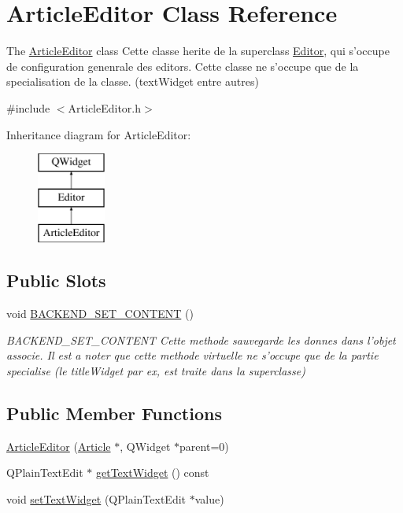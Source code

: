 \hypertarget{class_article_editor}{\section{Article\-Editor Class Reference}
\label{class_article_editor}
}


The \hyperlink{class_article_editor}{Article\-Editor} class Cette classe herite de la superclass \hyperlink{class_editor}{Editor}, qui s'occupe de configuration genenrale des editors. Cette classe ne s'occupe que de la specialisation de la classe. (text\-Widget entre autres)  




{\ttfamily \#include $<$Article\-Editor.\-h$>$}

Inheritance diagram for Article\-Editor\-:\begin{figure}[H]
\begin{center}
\leavevmode
\includegraphics[height=3.000000cm]{class_article_editor}
\end{center}
\end{figure}
\subsection*{Public Slots}
\begin{DoxyCompactItemize}
\item 
void \hyperlink{class_article_editor_a48c7f83de47d2710689c74069311c760}{B\-A\-C\-K\-E\-N\-D\-\_\-\-S\-E\-T\-\_\-\-C\-O\-N\-T\-E\-N\-T} ()
\begin{DoxyCompactList}\small\item\em B\-A\-C\-K\-E\-N\-D\-\_\-\-S\-E\-T\-\_\-\-C\-O\-N\-T\-E\-N\-T Cette methode sauvegarde les donnes dans l'objet associe. Il est a noter que cette methode virtuelle ne s'occupe que de la partie specialise (le title\-Widget par ex, est traite dans la superclasse) \end{DoxyCompactList}\end{DoxyCompactItemize}
\subsection*{Public Member Functions}
\begin{DoxyCompactItemize}
\item 
\hyperlink{class_article_editor_aec72d4d1e5ea20c86ee757d160f29fc0}{Article\-Editor} (\hyperlink{class_article}{Article} $\ast$, Q\-Widget $\ast$parent=0)
\item 
Q\-Plain\-Text\-Edit $\ast$ \hyperlink{class_article_editor_a477755003a224e76000eee84daf477ca}{get\-Text\-Widget} () const 
\item 
void \hyperlink{class_article_editor_a0ab30839a33e767f04c3512d5bf9dcc4}{set\-Text\-Widget} (Q\-Plain\-Text\-Edit $\ast$value)
\end{DoxyCompactItemize}
